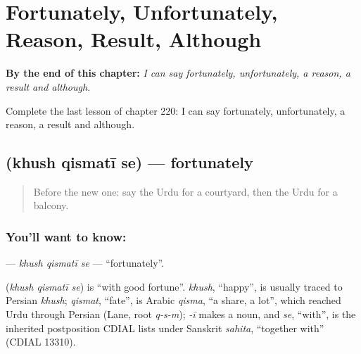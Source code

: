 
\chapter{Fortunately, Unfortunately, Reason, Result, Although}
\label{ch:ur-fortunately-unfortunately-reason-result-although}

\begin{chapteropening}
\textbf{By the end of this chapter:} \emph{I can say fortunately, unfortunately, a reason, a result and although.}

Complete the last lesson of chapter 220: I can say fortunately, unfortunately, a reason, a result and although.
\end{chapteropening}

\section[\texorpdfstring{\ur{خوش} \ur{قسمتی} \ur{سے} (khush qismatī se)}{خوش قسمتی سے (khush qismatī se)}]{   (khush qismatī se) — fortunately}

\label{lesson:UR-C220-khush-qismati-se}



\begin{quote}
Before the new one: say the Urdu for a courtyard, then the Urdu for a balcony.
\end{quote}

\subsection*{You'll want to know:   }
\textbf{  } — \emph{khush qismatī se} — \textquotedblleft{}fortunately\textquotedblright{}.

\begin{cousinweb}
\textbf{  } (\emph{khush qismatī se}) is \textquotedblleft{}with good fortune\textquotedblright{}. \emph{khush}, \textquotedblleft{}happy\textquotedblright{}, is usually traced to Persian \emph{khush}; \emph{qismat}, \textquotedblleft{}fate\textquotedblright{}, is Arabic \emph{qisma}, \textquotedblleft{}a share, a lot\textquotedblright{}, which reached Urdu through Persian (Lane, root \emph{q-s-m}); \emph{-ī} makes a noun, and \emph{se}, \textquotedblleft{}with\textquotedblright{}, is the inherited postposition CDIAL lists under Sanskrit \emph{sahita}, \textquotedblleft{}together with\textquotedblright{} (CDIAL 13310).
\end{cousinweb}

